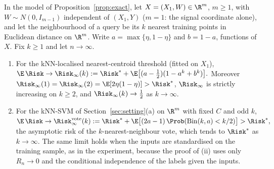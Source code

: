 \begin{theorem}\label{thm:kfixed}
In the model of Proposition~\ref{prop:exact}, let $X=(X_1,W)\in\R^m$, $m\ge1$, with $W\sim N(0,I_{m-1})$ independent of $(X_1,Y)$ ($m=1$: the signal coordinate alone), and let the neighbourhood of a query be its $k$ nearest training points in Euclidean distance on $\R^m$. Write $a=\max\{\eta,1-\eta\}$ and $b=1-a$, functions of $X$. Fix $k\ge1$ and let $n\to\infty$.
\begin{enumerate}[leftmargin=2em,label=(\roman*),itemsep=1pt]
\item For the kNN-localised nearest-centroid threshold (fitted on $X_1$),
\(
\E\,\Risk\to\Risk_\infty(k):=\Risk^*+\E\bigl[(a-\tfrac12)(1-a^k+b^k)\bigr].
\)
Moreover $\Risk_\infty(1)=\Risk_\infty(2)=\E[2\eta(1-\eta)]>\Risk^*$, $\Risk_\infty$ is strictly increasing on $k\ge2$, and $\Risk_\infty(k)\to\tfrac12$ as $k\to\infty$.
\item For the kNN-SVM of Section~\ref{sec:setting}(a) on $\R^m$ with fixed $C$ and odd $k$,
\(
\E\,\Risk\to\Risk^{\mathrm{vote}}_\infty(k):=\Risk^*+\E\bigl[(2a-1)\,\Prob(\mathrm{Bin}(k,a)<k/2)\bigr]>\Risk^*,
\)
the asymptotic risk of the $k$-nearest-neighbour vote, which tends to $\Risk^*$ as $k\to\infty$. The same limit holds when the inputs are standardised on the training sample, as in the experiment, because the proof of (ii) uses only $R_n\to0$ and the conditional independence of the labels given the inputs.
\end{enumerate}
\end{theorem}
